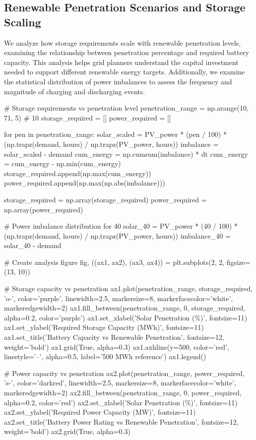 \documentclass[11pt,a4paper]{article}
\begin{document}
\subsection{Renewable Penetration Scenarios and Storage Scaling}

We analyze how storage requirements scale with renewable penetration levels, examining the
relationship between penetration percentage and required battery capacity. This analysis helps
grid planners understand the capital investment needed to support different renewable energy
targets. Additionally, we examine the statistical distribution of power imbalances to assess
the frequency and magnitude of charging and discharging events.

\begin{pycode}
# Storage requirements vs penetration level
penetration_range = np.arange(10, 71, 5)  # 10%
storage_required = []
power_required = []

for pen in penetration_range:
    solar_scaled = PV_power * (pen / 100) * (np.trapz(demand, hours) /
                                              np.trapz(PV_power, hours))
    imbalance = solar_scaled - demand
    cum_energy = np.cumsum(imbalance) * dt
    cum_energy = cum_energy - np.min(cum_energy)
    storage_required.append(np.max(cum_energy))
    power_required.append(np.max(np.abs(imbalance)))

storage_required = np.array(storage_required)
power_required = np.array(power_required)

# Power imbalance distribution for 40%
solar_40 = PV_power * (40 / 100) * (np.trapz(demand, hours) / np.trapz(PV_power, hours))
imbalance_40 = solar_40 - demand

# Create analysis figure
fig, ((ax1, ax2), (ax3, ax4)) = plt.subplots(2, 2, figsize=(13, 10))

# Storage capacity vs penetration
ax1.plot(penetration_range, storage_required, 'o-', color='purple',
         linewidth=2.5, markersize=8, markerfacecolor='white', markeredgewidth=2)
ax1.fill_between(penetration_range, 0, storage_required, alpha=0.2, color='purple')
ax1.set_xlabel('Solar Penetration (\%)', fontsize=11)
ax1.set_ylabel('Required Storage Capacity (MWh)', fontsize=11)
ax1.set_title('Battery Capacity vs Renewable Penetration', fontsize=12, weight='bold')
ax1.grid(True, alpha=0.3)
ax1.axhline(y=500, color='red', linestyle='--', alpha=0.5, label='500 MWh reference')
ax1.legend()

# Power capacity vs penetration
ax2.plot(penetration_range, power_required, 's-', color='darkred',
         linewidth=2.5, markersize=8, markerfacecolor='white', markeredgewidth=2)
ax2.fill_between(penetration_range, 0, power_required, alpha=0.2, color='red')
ax2.set_xlabel('Solar Penetration (\%)', fontsize=11)
ax2.set_ylabel('Required Power Capacity (MW)', fontsize=11)
ax2.set_title('Battery Power Rating vs Renewable Penetration', fontsize=12, weight='bold')
ax2.grid(True, alpha=0.3)


\end{pycode}
\end{document}
